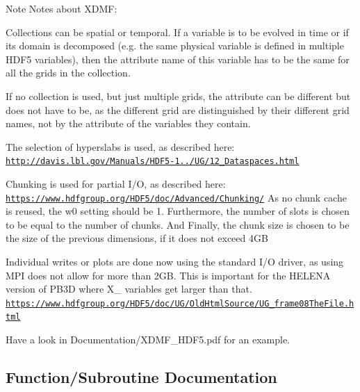\begin{DoxyNote}{Note}
Notes about X\+D\+MF\+:
\begin{DoxyItemize}
\item Collections can be spatial or temporal. If a variable is to be evolved in time or if its domain is decomposed (e.\+g. the same physical variable is defined in multiple H\+D\+F5 variables), then the attribute name of this variable has to be the same for all the grids in the collection.
\item If no collection is used, but just multiple grids, the attribute can be different but does not have to be, as the different grid are distinguished by their different grid names, not by the attribute of the variables they contain.
\item The selection of hyperslabs is used, as described here\+: \href{http://davis.lbl.gov/Manuals/HDF5-1.8.7/UG/12_Dataspaces.html}{\tt http\+://davis.\+lbl.\+gov/\+Manuals/\+H\+D\+F5-\/1../\+U\+G/12\+\_\+\+Dataspaces.\+html}
\item Chunking is used for partial I/O, as described here\+: \href{https://www.hdfgroup.org/HDF5/doc/Advanced/Chunking/}{\tt https\+://www.\+hdfgroup.\+org/\+H\+D\+F5/doc/\+Advanced/\+Chunking/} As no chunk cache is reused, the w0 setting should be 1. Furthermore, the number of slots is chosen to be equal to the number of chunks. And Finally, the chunk size is chosen to be the size of the previous dimensions, if it does not exceed 4\+GB
\item Individual writes or plots are done now using the standard I/O driver, as using M\+PI does not allow for more than 2\+GB. This is important for the H\+E\+L\+E\+NA version of P\+B3D where {\ttfamily X\+\_} variables get larger than that. \href{https://www.hdfgroup.org/HDF5/doc/UG/OldHtmlSource/UG_frame08TheFile.html}{\tt https\+://www.\+hdfgroup.\+org/\+H\+D\+F5/doc/\+U\+G/\+Old\+Html\+Source/\+U\+G\+\_\+frame08\+The\+File.\+html}
\item Have a look in Documentation/\+X\+D\+M\+F\+\_\+\+H\+D\+F5.\+pdf for an example. 
\end{DoxyItemize}
\end{DoxyNote}


\subsection{Function/\+Subroutine Documentation}
\mbox{\label{namespacehdf5__ops_ade36dbd73b60da30e33a1059e590f734}} 
